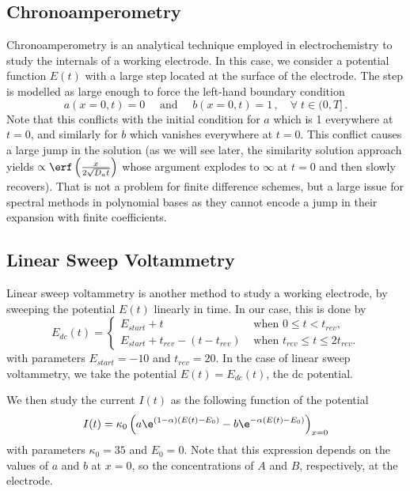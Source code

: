 \documentclass{prettytex/ox/mmsc-special-topic}
\begin{document}
  \subsection{Chronoamperometry}
  Chronoamperometry is an analytical technique employed in electrochemistry to study the internals of a working electrode. In this case, we consider a potential function $E(t)$ with a large step located at the surface of the electrode.
  The step is modelled as large enough to force the left-hand boundary condition
  \begin{equation}
    a(x=0, t) = 0 \quad\text{ and }\quad b(x=0, t) = 1\,,\quad \forall\; t \in (0, T]\,.
    \label{eq:chrono-bc}
  \end{equation}
  Note that this conflicts with the initial condition for $a$ which is 1 everywhere at $t = 0$, and similarly for $b$ which vanishes everywhere at $t = 0$.
  This conflict causes a large jump in the solution (as we will see later, the similarity solution approach yields $\propto \erf\left(\frac{x}{2 \sqrt{D_a t}}\right)$ whose argument explodes to $\infty$ at $t = 0$ and then slowly recovers).
  That is not a problem for finite difference schemes, but a large issue for spectral methods in polynomial bases as they cannot encode a jump in their expansion with finite coefficients.

  \subsection{Linear Sweep Voltammetry}
  Linear sweep voltammetry is another method to study a working electrode, by sweeping the potential $E(t)$ linearly in time. In our case, this is done by
  \begin{equation}
    E_{dc}(t) = \begin{cases}
      E_{start} + t                     & \text{ when } 0 \leq t< t_{rev},           \\
      E_{start} + t_{rev} - (t-t_{rev}) & \text{ when } t_{rev} \leq t\leq 2t_{rev}.
    \end{cases}
    \label{eq:linear-potential}
  \end{equation}
  with parameters $E_{start} = -10$ and $t_{rev} = 20$.
  In the case of linear sweep voltammetry, we take the potential $E(t) = E_{dc}(t)$, the \gls{dc} potential.

  We then study the current $I(t)$ as the following function of the potential
  \begin{equation}
    I(t) = \kappa_0 \left(a \e^{(1-\alpha) (E(t) - E_0)} - b \e^{-\alpha (E(t) - E_0)}\right)_{x=0}
    \label{eq:current}
  \end{equation}
  with parameters $\kappa_0 = 35$ and $E_0 = 0$.
  Note that this expression depends on the values of $a$ and $b$ at $x = 0$, so the concentrations of $A$ and $B$, respectively, at the electrode.
\end{document}
